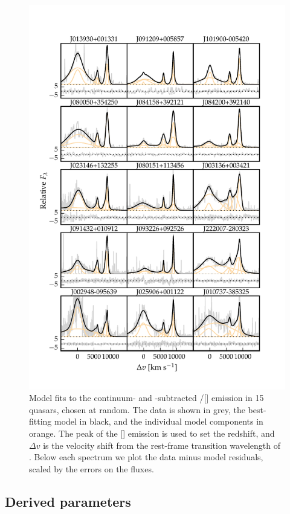 \begin{figure}
    \centering
    \includegraphics[width=\textwidth]{figures/chapter04/example_spectrum_grid.pdf} 
    \caption{Model fits to the continuum- and -subtracted \hbns/[] emission in 15 quasars, chosen at random. The data is shown in grey, the best-fitting model in black, and the individual model components in orange. The peak of the [] emission is used to set the redshift, and $\Delta{v}$ is the velocity shift from the rest-frame transition wavelength of \hb. Below each spectrum we plot the data minus model residuals, scaled by the errors on the fluxes.}     
    \label{fig:example_spectrum_grid}
\end{figure}

\subsection{Derived parameters}

